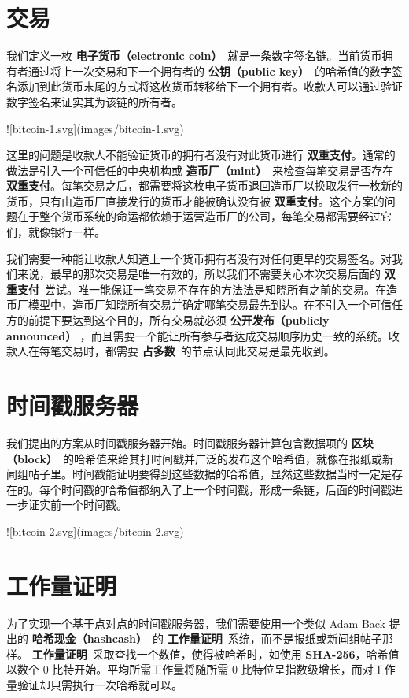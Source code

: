 \documentclass{article}
\begin{document}
\section{交易}
我们定义一枚 \textbf{电子货币（electronic coin）}\ 就是一条数字签名链。当前货币拥有者通过将上一次交易和下一个拥有者的 \textbf{公钥（public key）}\ 的哈希值的数字签名添加到此货币末尾的方式将这枚货币转移给下一个拥有者。收款人可以通过验证数字签名来证实其为该链的所有者。

![bitcoin-1.svg](images/bitcoin-1.svg)


这里的问题是收款人不能验证货币的拥有者没有对此货币进行 \textbf{双重支付}。通常的做法是引入一个可信任的中央机构或 \textbf{造币厂（mint）}\ 来检查每笔交易是否存在 \textbf{双重支付}。每笔交易之后，都需要将这枚电子货币退回造币厂以换取发行一枚新的货币，只有由造币厂直接发行的货币才能被确认没有被 \textbf{双重支付}。这个方案的问题在于整个货币系统的命运都依赖于运营造币厂的公司，每笔交易都需要经过它们，就像银行一样。

我们需要一种能让收款人知道上一个货币拥有者没有对任何更早的交易签名。对我们来说，最早的那次交易是唯一有效的，所以我们不需要关心本次交易后面的 \textbf{双重支付}\ 尝试。唯一能保证一笔交易不存在的方法法是知晓所有之前的交易。在造币厂模型中，造币厂知晓所有交易并确定哪笔交易最先到达。在不引入一个可信任方的前提下要达到这个目的，所有交易就必须 \textbf{公开发布（publicly announced）} \cite{Dai}，而且需要一个能让所有参与者达成交易顺序历史一致的系统。收款人在每笔交易时，都需要 \textbf{占多数}\ 的节点认同此交易是最先收到。

\section{时间戳服务器}
我们提出的方案从时间戳服务器开始。时间戳服务器计算包含数据项的 \textbf{区块（block）}\ 的哈希值来给其打时间戳并广泛的发布这个哈希值，就像在报纸或新闻组帖子里\cite{Massias,Haber,Bayer,Stornetta}。时间戳能证明要得到这些数据的哈希值，显然这些数据当时一定是存在的。每个时间戳的哈希值都纳入了上一个时间戳，形成一条链，后面的时间戳进一步证实前一个时间戳。

![bitcoin-2.svg](images/bitcoin-2.svg)

\section{工作量证明}
为了实现一个基于点对点的时间戳服务器，我们需要使用一个类似 Adam Back 提出的 \textbf{哈希现金（hashcash）}\cite{Back}\ 的 \textbf{工作量证明}\ 系统，而不是报纸或新闻组帖子那样。 \textbf{工作量证明}\ 采取查找一个数值，使得被哈希时，如使用 \textbf{SHA-256}，哈希值以数个 0 比特开始。平均所需工作量将随所需 0 比特位呈指数级增长，而对工作量验证却只需执行一次哈希就可以。
\end{document}

